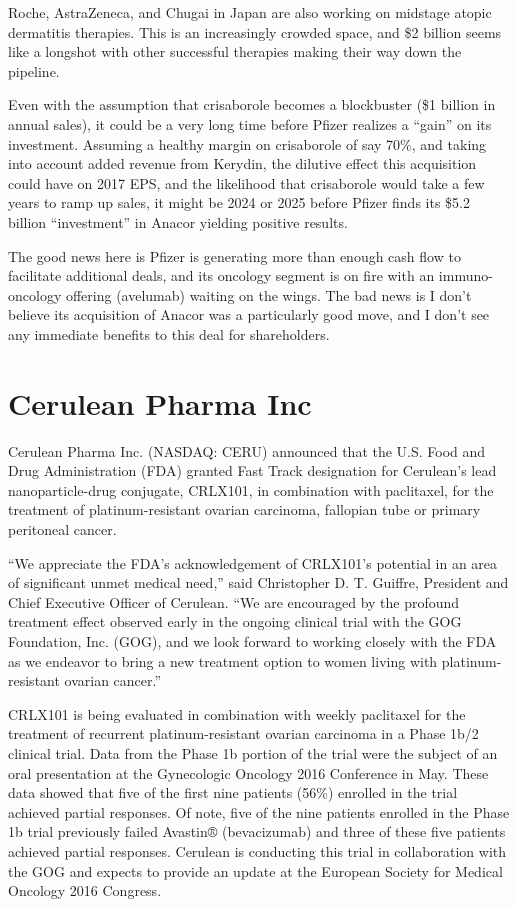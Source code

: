 \documentclass[letterpaper,12pt,english]{sphinxmanual}
\begin{document}
Roche, AstraZeneca, and Chugai in Japan are also working on midstage atopic dermatitis therapies. This is an increasingly crowded space, and \$2 billion seems like a longshot with other successful therapies making their way down the pipeline.

Even with the assumption that crisaborole becomes a blockbuster (\$1 billion in annual sales), it could be a very long time before Pfizer realizes a ``gain'' on its investment. Assuming a healthy margin on crisaborole of say 70\%, and taking into account added revenue from Kerydin, the dilutive effect this acquisition could have on 2017 EPS, and the likelihood that crisaborole would take a few years to ramp up sales, it might be 2024 or 2025 before Pfizer finds its \$5.2 billion ``investment'' in Anacor yielding positive results.

The good news here is Pfizer is generating more than enough cash flow to facilitate additional deals, and its oncology segment is on fire with an immuno-oncology offering (avelumab) waiting on the wings. The bad news is I don't believe its acquisition of Anacor was a particularly good move, and I don't see any immediate benefits to this deal for shareholders.


\chapter{Cerulean Pharma Inc}
\label{chapters/chapter5:ceru}\label{chapters/chapter5::doc}\label{chapters/chapter5:cerulean-pharma-inc}
Cerulean Pharma Inc. (NASDAQ: CERU) announced that the U.S. Food and Drug Administration (FDA) granted Fast Track designation for Cerulean’s lead nanoparticle-drug conjugate, CRLX101, in combination with paclitaxel, for the treatment of platinum-resistant ovarian carcinoma, fallopian tube or primary peritoneal cancer.

“We appreciate the FDA’s acknowledgement of CRLX101’s potential in an area of significant unmet medical need,” said Christopher D. T. Guiffre, President and Chief Executive Officer of Cerulean. “We are encouraged by the profound treatment effect observed early in the ongoing clinical trial with the GOG Foundation, Inc. (GOG), and we look forward to working closely with the FDA as we endeavor to bring a new treatment option to women living with platinum-resistant ovarian cancer.”

CRLX101 is being evaluated in combination with weekly paclitaxel for the treatment of recurrent platinum-resistant ovarian carcinoma in a Phase 1b/2 clinical trial. Data from the Phase 1b portion of the trial were the subject of an oral presentation at the Gynecologic Oncology 2016 Conference in May. These data showed that five of the first nine patients (56\%) enrolled in the trial achieved partial responses. Of note, five of the nine patients enrolled in the Phase 1b trial previously failed Avastin® (bevacizumab) and three of these five patients achieved partial responses. Cerulean is conducting this trial in collaboration with the GOG and expects to provide an update at the European Society for Medical Oncology 2016 Congress.
\end{document}

